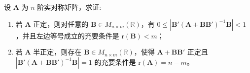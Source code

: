 \documentclass[../../main.tex]{subfiles}%
\begin{document}
\begin{example}
设 $\boldsymbol{A}$ 为 $n$ 阶实对称矩阵，求证:
\begin{enumerate}[(1)]
\item 若 $\boldsymbol{A}$ 正定，则对任意的 $\boldsymbol{B} \in M_{n \times m}(\mathbb{R})$，有 $0 \leqslant |\boldsymbol{B}'(\boldsymbol{A} + \boldsymbol{B}\boldsymbol{B}')^{-1}\boldsymbol{B}| < 1$，并且左边等号成立的充要条件是 $\text{r}(\boldsymbol{B}) < m$；

\item 若 $\boldsymbol{A}$ 半正定，则存在 $\boldsymbol{B} \in M_{n \times m}(\mathbb{R})$，使得 $\boldsymbol{A} + \boldsymbol{B}\boldsymbol{B}'$ 正定且 $|\boldsymbol{B}'(\boldsymbol{A} + \boldsymbol{B}\boldsymbol{B}')^{-1}\boldsymbol{B}| = 1$ 的充要条件是 $\text{r}(\boldsymbol{A}) = n - m$。
\end{enumerate}
\end{example}
\end{document}
